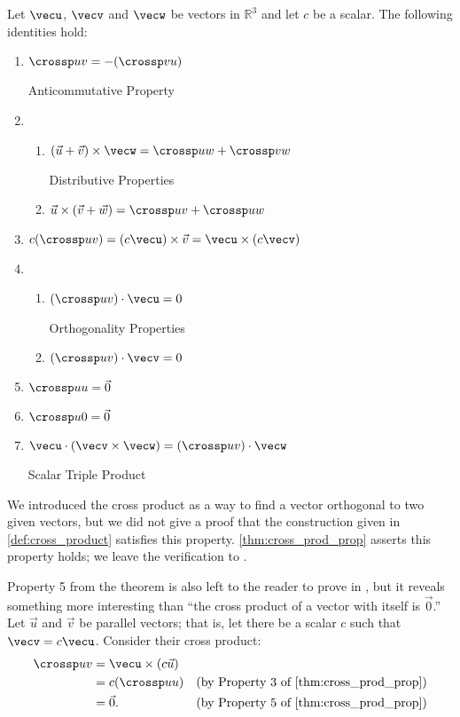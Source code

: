 {
\begin{theorem}\label{thm:cross_prod_prop}
Let $\vecu$, $\vecv$ and $\vecw$ be vectors in $\mathbb{R}^3$ and let $c$ be a scalar. The following identities hold:
\begin{enumerate}
	\item \parbox{167pt}{$\crossp uv = -(\crossp vu)$} Anticommutative Property
	\item	\begin{enumerate}
		\item \parbox{145pt}{$(\vec u+\vec v)\times \vecw = \crossp uw+\crossp vw$} Distributive Properties
		\item	$\vec u \times (\vec v+\vec w) = \crossp uv+\crossp uw$
	\end{enumerate}
	\item		$c(\crossp uv) = (c\vecu) \times \vec v = \vecu \times (c\vecv)$
	\item		\begin{enumerate}
		\item \parbox{145pt}{$(\crossp uv)\cdot \vecu = 0$} Orthogonality Properties
		\item	$(\crossp uv)\cdot \vecv = 0$
	\end{enumerate}
	\item		$\crossp uu = \vec 0$
	\item		$\crossp u0 = \vec 0$
	\item		\parbox{167pt}{$\vecu \cdot (\vecv\times\vecw) = (\crossp uv)\cdot \vecw$} Scalar Triple Product
\end{enumerate}
\end{theorem}
}

We introduced the cross product as a way to find a vector orthogonal to two given vectors, but we did not give a proof that the construction given in \autoref{def:cross_product} satisfies this property. \autoref{thm:cross_prod_prop} asserts this property holds; we leave the verification to .

Property 5 from the theorem is also left to the reader to prove in , but it reveals something more interesting than ``the cross product of a vector with itself is $\vec 0$.'' Let $\vec u$ and $\vec v$ be parallel vectors; that is, let there be a scalar $c$ such that $\vecv = c\vecu$. Consider their cross product:
\begin{align*}
	\crossp uv
	&= \vecu \times (c\vec u) \\
	&= c(\crossp uu) & \text{(by Property 3 of \autoref{thm:cross_prod_prop})} \\
	&= \vec 0. & \text{(by Property 5 of \autoref{thm:cross_prod_prop})}
\end{align*}


